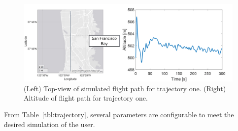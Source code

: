 \begin{figure}[!ht]
    \centering
    \includegraphics[width=\linewidth]{Figures/Results/trajectory1.png}
    \caption{(Left) Top-view of simulated flight path for trajectory one. (Right) Altitude of flight path for trajectory one.}\label{fig:trajectory1}
\end{figure}

From Table~\ref{tbl:trajectory}, several parameters are configurable to meet the desired simulation of the user.

